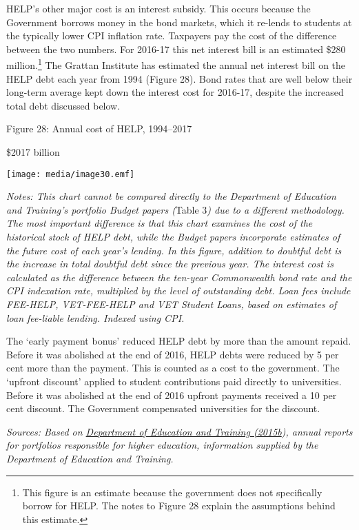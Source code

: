 \documentclass[]{book}
\begin{document}
HELP's other major cost is an interest subsidy. This occurs because the Government borrows money in the bond markets, which it re-lends to students at the typically lower CPI inflation rate. Taxpayers pay the cost of the difference between the two numbers. For 2016-17 this net interest bill is an estimated \$280 million.\footnote{This figure is an estimate because the government does not specifically borrow for HELP. The notes to Figure 28 explain the assumptions behind this estimate.} The Grattan Institute has estimated the annual net interest bill on the HELP debt each year from 1994 (Figure 28). Bond rates that are well below their long-term average kept down the interest cost for 2016-17, despite the increased total debt discussed below.

\protect\hypertarget{_Ref453350703}{}{}Figure 28: Annual cost of HELP, 1994--2017

\$2017 billion

\texttt{[image: media/image30.emf]}

\emph{Notes: This chart cannot be compared directly to the Department of Education and Training's portfolio Budget papers (}Table 3\emph{) due to a different methodology. The most important difference is that this chart examines the cost of the historical stock of HELP debt, while the Budget papers incorporate estimates of the future cost of each year's lending. In this figure, addition to doubtful debt is the increase in total doubtful debt since the previous year. The interest cost is calculated as the difference between the ten-year Commonwealth bond rate and the CPI indexation rate, multiplied by the level of outstanding debt. Loan fees include FEE-HELP, VET-FEE-HELP and VET Student Loans, based on estimates of loan fee-liable lending. Indexed using CPI.}

The `early payment bonus' reduced HELP debt by more than the amount repaid. Before it was abolished at the end of 2016, HELP debts were reduced by 5 per cent more than the payment. This is counted as a cost to the government. The `upfront discount' applied to student contributions paid directly to universities. Before it was abolished at the end of 2016 upfront payments received a 10 per cent discount. The Government compensated universities for the discount.

\emph{Sources: Based on \protect\hyperlink{_ENREF_62}{Department of Education and Training (2015b}), annual reports for portfolios responsible for higher education, information supplied by the Department of Education and Training. }
\end{document}
